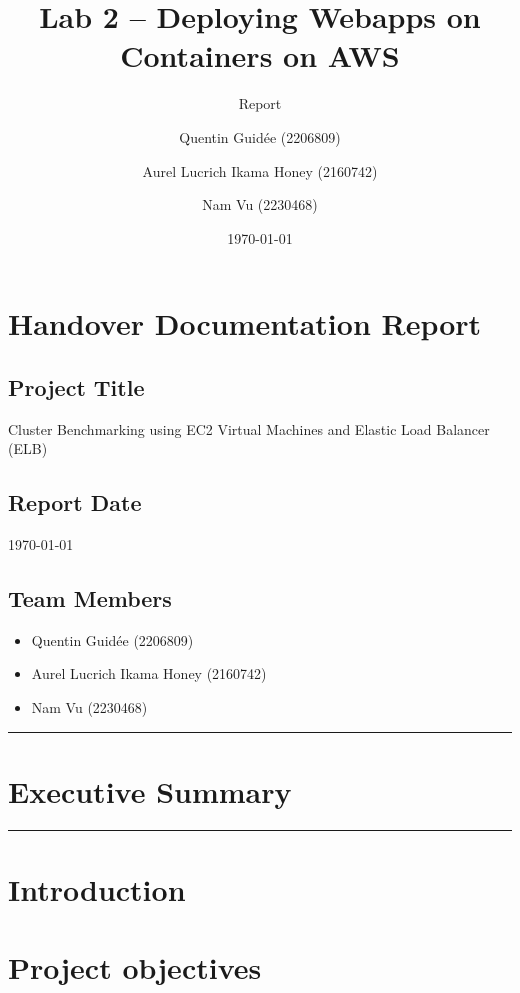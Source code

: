 \documentclass[letterpaper,headings=standardclasses,parskip=half]{scrartcl}
\title{Lab 2 – Deploying Webapps on Containers on AWS}
\subtitle{Report}
\author{
    Quentin Guidée (2206809) 
    \and
    Aurel Lucrich Ikama Honey (2160742)
    \and
    Nam Vu (2230468)
}
\date{\today}
\newcommand{\todo}{{\color{red}{TODO}}}
\begin{document}
\maketitle
\tableofcontents
\thispagestyle{empty}

\clearpage
{}

\section*{Handover Documentation Report}

\subsection*{Project Title}

Cluster Benchmarking using EC2 Virtual Machines and Elastic Load Balancer (ELB)

\subsection*{Report Date}

\today

\subsection*{Team Members}

\begin{itemize}
    \item Quentin Guidée (2206809)
    \item Aurel Lucrich Ikama Honey (2160742)
    \item Nam Vu (2230468)
\end{itemize}

\noindent\rule{\textwidth}{0.3pt}

\section*{Executive Summary}

\noindent\rule{\textwidth}{0.3pt}

\section{Introduction}

\todo

\section{Project objectives}
\end{document}
